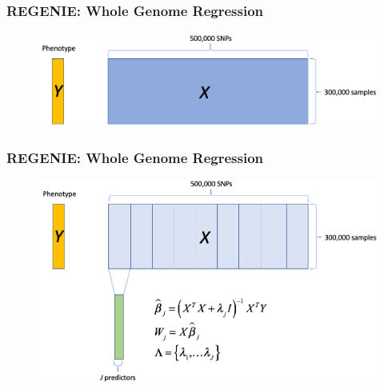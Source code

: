 \documentclass{beamer}
\begin{document}
\begin{frame}
	\frametitle{\bf  REGENIE: Whole Genome Regression}
	\vspace{-1em}
\begin{figure}
	\includegraphics[scale=.35]{Figures/regenie_wgr}
\end{figure}
\end{frame}

\begin{frame}
	\frametitle{\bf  REGENIE: Whole Genome Regression}
	\vspace{-1em}
	\begin{figure}
		\includegraphics[scale=.35]{Figures/regenie_wgr2}
	\end{figure}
\end{frame}
\end{document}
